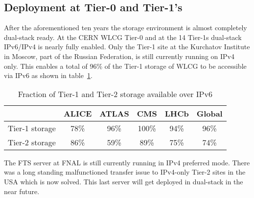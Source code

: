 
%
\subsection{Deployment at Tier-0 and Tier-1's}
After the aforementioned ten years the storage environment is almost completely dual-stack ready. At the CERN WLCG Tier-0 and at the 14 Tier-1s dual-stack IPv6/IPv4 is nearly fully enabled. Only the Tier-1 site at the Kurchatov Institute in Moscow, part of the Russian Federation, is still currently running on IPv4 only. This enables a total of 96\% of the Tier-1 storage of WLCG to be accessible via IPv6 as shown in table~\ref{tab:t012stor}.
\begin{table}[h]
\centering
\caption{Fraction of Tier-1 and Tier-2 storage available over IPv6}
\label{tab:t012stor}
\begin{tabular}{lccccc}
\hline
& ALICE & ATLAS & CMS & LHCb & Global \\\hline
Tier-1 storage & 78\% & 96\% & 100\% & 94\% & 96\% \\
Tier-2 storage & 86\% & 59\% &  89\% & 75\% & 74\% \\\hline
\end{tabular}
\end{table}

The FTS server at FNAL is still currently running in IPv4 preferred mode. There was a long standing malfunctioned transfer issue to IPv4-only Tier-2 sites in the USA which is now solved. This last server will get deployed in dual-stack in the near future.
